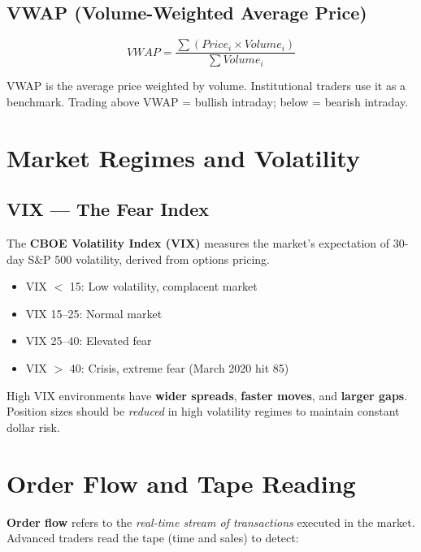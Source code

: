 \subsection{VWAP (Volume-Weighted Average Price)}

\begin{formulabox}
\[
  VWAP = \frac{\sum (Price_i \times Volume_i)}{\sum Volume_i}
\]
\end{formulabox}

VWAP is the average price weighted by volume. Institutional traders use it as a benchmark.
Trading above VWAP = bullish intraday; below = bearish intraday.

\section{Market Regimes and Volatility}

\subsection{VIX — The Fear Index}
The \textbf{CBOE Volatility Index (VIX)} measures the market's expectation of
30-day S\&P 500 volatility, derived from options pricing.

\begin{itemize}
  \item VIX $<$ 15: Low volatility, complacent market
  \item VIX 15--25: Normal market
  \item VIX 25--40: Elevated fear
  \item VIX $>$ 40: Crisis, extreme fear (March 2020 hit 85)
\end{itemize}

\begin{notebox}
High VIX environments have \textbf{wider spreads}, \textbf{faster moves}, and
\textbf{larger gaps}. Position sizes should be \emph{reduced} in high volatility
regimes to maintain constant dollar risk.
\end{notebox}

\section{Order Flow and Tape Reading}

\textbf{Order flow} refers to the \emph{real-time stream of transactions} executed in the market.
Advanced traders read the tape (time and sales) to detect:

